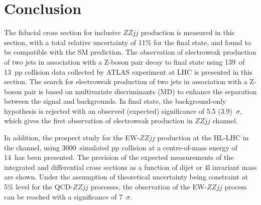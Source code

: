 \section{Conclusion}

The fiducial cross section for inclusive $ZZjj$ production is measured in this section, with a total relative uncertainty of 11\% for the \lllljj final state,
and found to be compatible with the SM prediction.
The observation of electroweak production of two jets in association with a Z-boson pair decay to \llll final state 
using 139~\ifb of 13~\tev pp collision data collected by ATLAS experiment at LHC is presented in this section.
The search for electroweak production of two jets in association with a Z-boson pair is based on multivariate discriminants (MD) to enhance the separation between the signal and backgrounds.
In \llll final state, the background-only hypothesis is rejected with an observed (expected) significance of 5.5 (3.9)~$\sigma$,
which gives the first observation of electroweak production in $ZZjj$ channel.

In addition, the prospect study for the EW-$ZZjj$ production at the HL-LHC in the \llll channel, using 3000~\ifb simulated pp collision at a centre-of-mass energy of 14~\tev has been presented.
The precision of the expected measurements of the integrated and differential cross sections as a function of dijet or 4l invariant mass are shown.
Under the assumption of theoretical uncertainty being constraint at 5\% level for the QCD-$ZZjj$ processes, 
the observation of the EW-$ZZjj$ process can be reached with a significance of 7~$\sigma$.
